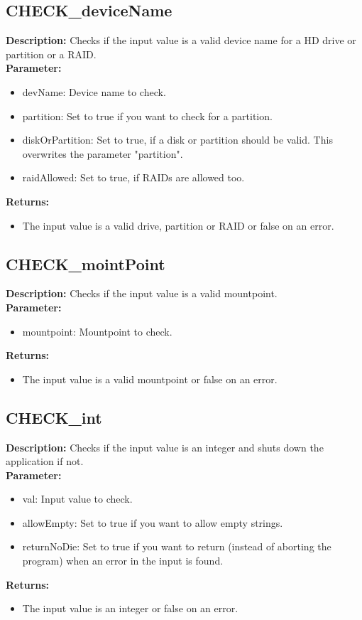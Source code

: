 \subsection{CHECK\_deviceName}
\textbf{Description:} Checks if the input value is a valid device name for a HD drive or partition or a RAID.\\
\textbf{Parameter:}
\begin{itemize}
\item devName: Device name to check.
\item partition: Set to true if you want to check for a partition.
\item diskOrPartition: Set to true, if a disk or partition should be valid. This overwrites the parameter "partition".
\item raidAllowed: Set to true, if RAIDs are allowed too.
\end{itemize}
\textbf{Returns:}
\begin{itemize}
\item The input value is a valid drive, partition or RAID or false on an error.
\end{itemize}

\subsection{CHECK\_mointPoint}
\textbf{Description:} Checks if the input value is a valid mountpoint.\\
\textbf{Parameter:}
\begin{itemize}
\item mountpoint: Mountpoint to check.
\end{itemize}
\textbf{Returns:}
\begin{itemize}
\item The input value is a valid mountpoint or false on an error.
\end{itemize}

\subsection{CHECK\_int}
\textbf{Description:} Checks if the input value is an integer and shuts down the application if not.\\
\textbf{Parameter:}
\begin{itemize}
\item val: Input value to check.
\item allowEmpty: Set to true if you want to allow empty strings.
\item returnNoDie: Set to true if you want to return (instead of aborting the program) when an error in the input is found.
\end{itemize}
\textbf{Returns:}
\begin{itemize}
\item The input value is an integer or false on an error.
\end{itemize}

